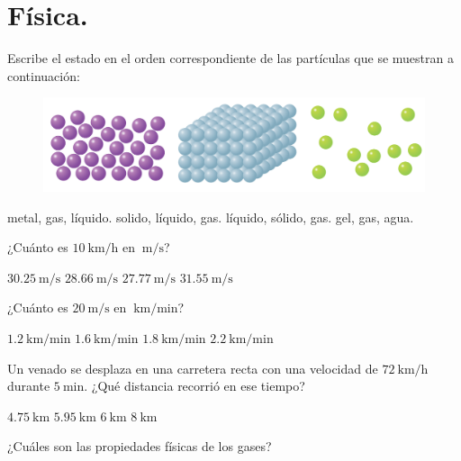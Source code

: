 \documentclass[12pt]{exam}
\begin{document}
\section{Física.}

\begin{multicols}{2}
\begin{questions}
     \question Escribe el estado en el orden correspondiente de las partículas que se muestran a continuación:
     \begin{figure}[H]
        \centering
        \includegraphics[scale=0.25]{Imagenes/Fisica_01.png}
     \end{figure}
     \begin{choices}
         \choice metal, gas, líquido.
         \choice solido, líquido, gas.
         \choice líquido, sólido, gas.
         \choice gel, gas, agua.
     \end{choices}
     \question ¿Cuánto es $\SI{10}{\kilo\meter\per\hour}$ en $\SI{}{\meter\per\second}$?
     \begin{choices}
        \choice $\SI{30.25}{\meter\per\second}$
        \choice $\SI{28.66}{\meter\per\second}$
        \choice $\SI{27.77}{\meter\per\second}$
        \choice $\SI{31.55}{\meter\per\second}$
    \end{choices}
    \question ¿Cuánto es $\SI{20}{\meter\per\second}$ en $\SI{}{\kilo\meter\per\minute}$?
     \begin{choices}
        \choice $\SI{1.2}{\kilo\meter\per\minute}$
        \choice $\SI{1.6}{\kilo\meter\per\minute}$
        \choice $\SI{1.8}{\kilo\meter\per\minute}$
        \choice $\SI{2.2}{\kilo\meter\per\minute}$
    \end{choices}
    \question Un venado se desplaza en una carretera recta con una velocidad de $\SI{72}{\kilo\meter\per\hour}$ durante $\SI{5}{\minute}$. ¿Qué distancia recorrió en ese tiempo?
    \begin{choices}
        \choice $\SI{4.75}{\kilo\meter}$
        \choice $\SI{5.95}{\kilo\meter}$
        \choice $\SI{6}{\kilo\meter}$
        \choice $\SI{8}{\kilo\meter}$
    \end{choices}
    \question ¿Cuáles son las propiedades físicas de los gases?

\end{questions}
\end{multicols}
\end{document}
